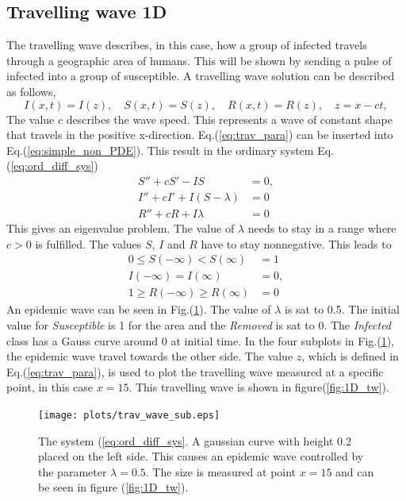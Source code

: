 \documentclass[%
twoside,                 %
final,                   %
10pt]{article}
\begin{document}
\subsection{Travelling wave 1D}
The travelling wave describes, in this case, how a group of infected travels through a geographic area of humans. This will be shown by sending a pulse of infected into a group of susceptible. A travelling wave solution can be described as follows,
\begin{equation} \label{eq:trav_para}
I(x,t)=I(z),\quad S(x,t)=S(z),\quad R(x,t) = R(z),\quad z = x-ct,
\end{equation}
The value $c$ describes the wave speed. This represents a wave of constant shape that travels in the positive x-direction. Eq.(\ref{eq:trav_para}) can be inserted into Eq.(\ref{eq:simple_non_PDE}). This result in the ordinary system Eq.(\ref{eq:ord_diff_sys})
\begin{equation} \label{eq:ord_diff_sys}
	\begin{aligned}
	S'' + cS' - IS &= 0,\\
	I'' + cI' + I(S-\lambda)&=0\\
	R'' + cR  + I\lambda &=0
	\end{aligned}
\end{equation}
This gives an eigenvalue problem. The value of $\lambda$ needs to stay in a range where $c > 0$ is fulfilled. The values $S$, $I$ and $R$ have to stay nonnegative. This leads to
\begin{equation} 
	\begin{aligned}
	0 \leq S(-\infty) < S(\infty)&=1\\
	I(-\infty)=I(\infty)&=0,\\
	1 \geq R(-\infty)\geq R(\infty) &= 0
	\end{aligned}
\end{equation}
An epidemic wave can be seen in Fig.(\ref{fig:1D_sub}). The value of $\lambda$ is sat to 0.5. The initial value for \emph{Susceptible} is 1 for the area and the \emph{Removed} is sat to 0. The \emph{Infected} class has a Gauss curve around 0 at initial time. In the four subplots in Fig.(\ref{fig:1D_sub}), the epidemic wave travel towards the other side. The value $z$, which is defined in Eq.(\ref{eq:trav_para}), is used to plot the travelling wave measured at a specific point, in this case $x=15$. This travelling wave is shown in figure(\ref{fig:1D_tw}).       


\begin{figure}[ht]
  \centerline{\texttt{[image: plots/trav\_wave\_sub.eps]}}
  \caption{
  \label{fig:1D_sub} The system (\ref{eq:ord_diff_sys}. A gaussian curve with height 0.2 placed on the left side. This causes an epidemic wave controlled by the parameter $\lambda=0.5$. The size is measured at point $x=15$ and can be seen in figure (\ref{fig:1D_tw}).
  }
\end{figure}
\end{document}
